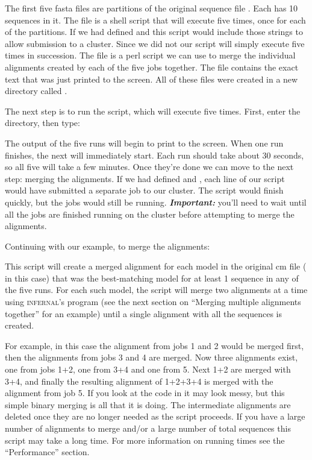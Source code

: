The first five fasta files are partitions of the original sequence
file . Each has 10 sequences in it. The file
 is a shell script that will execute
 five times, once for each of the partitions. 
If we had defined  and
 this script would include those strings to
allow submission to a cluster. Since we did not our script will simply
execute  five times in succession. The file
 is a perl script we can use to merge the
individual alignments created by each of the five jobs together.
The  file contains the exact text that was just
printed to the screen. All of these files were created in a new
directory called .

The next step is to run the  script, which will
execute  five times. First, enter the
 directory, then type:


The output of the five  runs will begin to print to
the screen. When one run finishes, the next will immediately
start. Each run should take about 30 seconds, so all five will take a
few minutes. Once they're done we can move to the next step: merging
the alignments. If we had defined  and
, each line of our script would have submitted
a separate job to our cluster. The script would finish quickly, but
the jobs would still be running. \textbf{\emph{Important: }} you'll
need to wait until all the jobs are finished running on the
cluster before attempting to merge the alignments.

Continuing with our example, to merge the alignments:

This script will create a merged alignment for each model in the
original cm file ( in this case) that was the
best-matching model for at least 1 sequence in any of the five runs.
For each such model, the script will merge two alignments at a time
using \textsc{infernal}'s  program (see the next section
on ``Merging multiple alignments together'' for an example)
until a single alignment with all the sequences is created. 

For example, in this case the alignment from jobs 1 and 2 would be
merged first, then the alignments from jobs 3 and 4 are merged. Now
three alignments exist, one from jobs 1+2, one from 3+4 and one from
5. Next 1+2 are merged with 3+4, and finally the resulting alignment
of 1+2+3+4 is merged with the alignment from job 5. If you look at the
code in  it may look messy, but this
simple binary merging is all that it is doing. The intermediate
alignments are deleted once they are no longer needed as the script
proceeds. If you have a large number of alignments to merge and/or a
large number of total sequences this script may take a long time. For
more information on running times see the ``Performance'' section.

